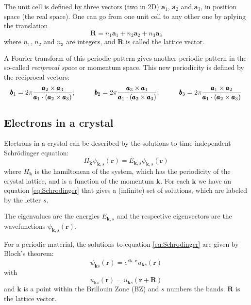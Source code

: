 \documentclass[a4paper,12pt]{report}
\begin{document}
The unit cell is defined by three vectors (two in 2D) $\pmb{a}_1$, $\pmb{a}_2$ and $\pmb{a}_3$,
in position space (the real space).
One can go from one unit cell to any other one by aplying the translation
\begin{equation}
 \pmb{R} = n_1\pmb{a}_1 + n_2\pmb{a}_2 + n_3\pmb{a}_3
\end{equation}
where $n_1$, $n_2$ and $n_3$ are integers, and $\pmb{R}$ is called the lattice vector.

A Fourier transform of this periodic pattern gives another periodic pattern in the so-called
\emph{reciprocal space} or momentum space.
This new periodicity is defined by the reciprocal vectors:
\begin{equation*}
 \pmb{b}_1 = 2\pi\dfrac{\pmb{a}_2\times\pmb{a}_3}{\pmb{a}_1\cdot (\pmb{a}_2\times\pmb{a}_3)};\hspace*{1cm}
 \pmb{b}_2 = 2\pi\dfrac{\pmb{a}_3\times\pmb{a}_1}{\pmb{a}_1\cdot (\pmb{a}_2\times\pmb{a}_3)};\hspace*{1cm}
 \pmb{b}_3 = 2\pi\dfrac{\pmb{a}_1\times\pmb{a}_2}{\pmb{a}_1\cdot (\pmb{a}_2\times\pmb{a}_3)}
\end{equation*}

\subsection*{Electrons in a crystal}

Electrons in a crystal can be described by the solutions to time independent Schr\"odinger equation:
\begin{equation}\label{eq:Schrodinger}
 H_{\pmb{k}}\psi_{\pmb{k},s}(\pmb{r}) = E_{\pmb{k},s}\psi_{\pmb{k},s}(\pmb{r})
\end{equation}
where $H_{\pmb{k}}$ is the hamiltonean of the system, which has the periodicity of the crystal lattice,
and is a function of the momentum $\pmb{k}$.
For each $\pmb{k}$ we have an equation \ref{eq:Schrodinger} that gives a (infinite) set of solutions,
which are labeled by the letter $s$.

The eigenvalues are the energies $E_{\pmb{k},s}$ and the respective eigenvectors are the wavefunctions
$\psi_{\pmb{k},s}(\pmb{r})$.

For a periodic material, the solutions to equation \ref{eq:Schrodinger} are given by Bloch's theorem:
\begin{equation}
 \psi_{\pmb{k}s}(\pmb{r}) = e^{i\pmb{k}\cdot\pmb{r}}u_{\pmb{k}s}(\pmb{r})
\end{equation}
with
\begin{equation}
 u_{\pmb{k}s}(\pmb{r}) = u_{\pmb{k}s}(\pmb{r} + \pmb{R})
\end{equation}
and $\pmb{k}$ is a point within the Brillouin Zone (BZ) and $s$ numbers the bands.
$\pmb{R}$ is the lattice vector.
\end{document}
